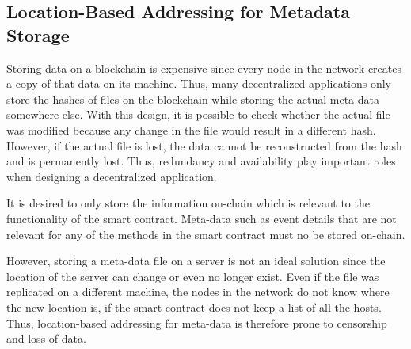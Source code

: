 
\subsection{Location-Based Addressing for Metadata Storage}\label{subsection:metadata-storage}

Storing data on a blockchain is expensive since every node in the network creates a copy of that data on its machine. Thus, many decentralized applications only store the hashes of files on the blockchain while storing the actual meta-data somewhere else. With this design, it is possible to check whether the actual file was modified because any change in the file would result in a different hash. However, if the actual file is lost, the data cannot be reconstructed from the hash and is permanently lost. Thus, redundancy and availability play important roles when designing a decentralized application.

It is desired to only store the information on-chain which is relevant to the functionality of the smart contract. Meta-data such as event details that are not relevant for any of the methods in the smart contract must no be stored on-chain.

However, storing a meta-data file on a server is not an ideal solution since the location of the server can change or even no longer exist. Even if the file was replicated on a different machine, the nodes in the network do not know where the new location is, if the smart contract does not keep a list of all the hosts. Thus, location-based addressing for meta-data is therefore prone to censorship and loss of data. 
